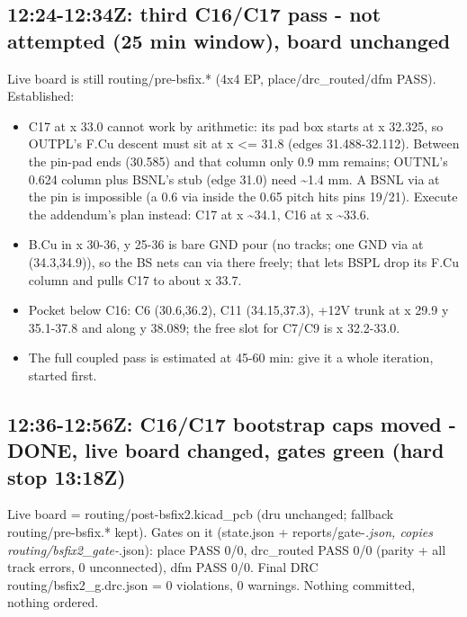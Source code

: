 \documentclass[11pt]{article}
\begin{document}
\subsection*{12:24-12:34Z: third C16/C17 pass - not attempted (25 min window), board unchanged}
Live board is still routing/pre-bsfix.{*} (4x4 EP, place/drc\_routed/dfm PASS). Established:

\begin{itemize}
\item C17 at x 33.0 cannot work by arithmetic: its pad box starts at x 32.325, so OUTPL's F.Cu
descent must sit at x \textless{}= 31.8 (edges 31.488-32.112). Between the pin-pad ends (30.585) and that
column only 0.9 mm remains; OUTNL's 0.624 column plus BSNL's stub (edge 31.0) need \textasciitilde{}1.4 mm.
A BSNL via at the pin is impossible (a 0.6 via inside the 0.65 pitch hits pins 19/21).
Execute the addendum's plan instead: C17 at x \textasciitilde{}34.1, C16 at x \textasciitilde{}33.6.
\item B.Cu in x 30-36, y 25-36 is bare GND pour (no tracks; one GND via at (34.3,34.9)), so the BS
nets can via there freely; that lets BSPL drop its F.Cu column and pulls C17 to about x 33.7.
\item Pocket below C16: C6 (30.6,36.2), C11 (34.15,37.3), +12V trunk at x 29.9 y 35.1-37.8 and along
y 38.089; the free slot for C7/C9 is x 32.2-33.0.
\item The full coupled pass is estimated at 45-60 min: give it a whole iteration, started first.
\end{itemize}
\subsection*{12:36-12:56Z: C16/C17 bootstrap caps moved - DONE, live board changed, gates green (hard stop 13:18Z)}
Live board = routing/post-bsfix2.kicad\_pcb (dru unchanged; fallback routing/pre-bsfix.{*} kept). Gates on it (state.json + reports/gate-\emph{.json, copies routing/bsfix2\_gate-}.json): place PASS 0/0, drc\_routed PASS 0/0 (parity + all track errors, 0 unconnected), dfm PASS 0/0. Final DRC routing/bsfix2\_g.drc.json = 0 violations, 0 warnings. Nothing committed, nothing ordered.
\end{document}
